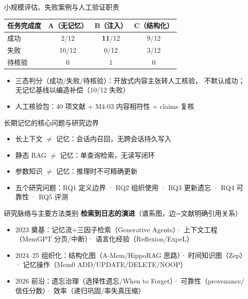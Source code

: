 \documentclass[UTF8, aspectratio=169]{ctexbeamer}
\begin{document}
\begin{frame}{小规模评估、失败案例与人工验证职责}
\begin{center}
\begin{tabular}{lccc}
\toprule
任务完成度 & A（无记忆） & B（注入） & C（结构化） \\
\midrule
成功 & 2/12 & \textbf{11}/12 & 9/12 \\
失败 & 10/12 & 0/12 & 3/12 \\
待核验 & 0 & 1 & 0 \\
\bottomrule
\end{tabular}
\end{center}
\begin{itemize}
  \item 三态判分（成功/失败/待核验）：开放式内容主张转人工核验，
        不默认成功；无记忆基线以编造补偿（10/12 失败）
  \item 人工核验包：40 项文献 + M4-03 内容相符性 + claims 复核
\end{itemize}
\end{frame}

\begin{frame}{长期记忆的核心问题与研究边界}
\begin{itemize}
  \item 长上下文 $\neq$ 记忆：会话内召回，无跨会话持久写入
  \item 静态 RAG $\neq$ 记忆：单查询检索，无读写闭环
  \item 参数知识 $\neq$ 记忆：推理时不可精确更新
  \item 五个研究问题：RQ1 定义边界 · RQ2 组织使用 · RQ3 更新遗忘 ·
        RQ4 可靠性 · RQ5 评测
\end{itemize}
\end{frame}

\begin{frame}{研究脉络与主要方法类别}
\textbf{检索到日志的演进}（谱系图，边=文献明确引用关系）
\begin{itemize}
  \item 2023 奠基：记忆流+三因子检索（Generative Agents）· 上下文工程
        （MemGPT 分页/中断）· 语言化经验（Reflexion/ExpeL）
  \item 2024–25 组织化：结构化图（A-Mem/HippoRAG 思路）· 时间知识图（Zep）·
        记忆操作（Mem0 ADD/UPDATE/DELETE/NOOP）
  \item 2026 前沿：遗忘治理（选择性遗忘/When to Forget）·
        可靠性（provenance/信任分数）· 效率（递归巩固/率失真压缩）
\end{itemize}
\end{frame}
\end{document}
